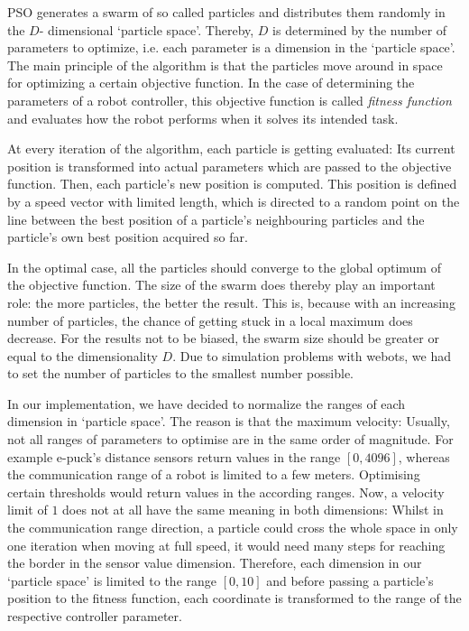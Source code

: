 \documentclass[journal]{IEEEtran}
\begin{document}
PSO generates a swarm of so called particles and distributes them randomly in the $D$-
dimensional  `particle space'. Thereby, $D$ is determined by the number of parameters to 
optimize, i.e. each parameter is a dimension in the `particle space'. The main principle of 
the algorithm is that the particles move around in space for optimizing a certain objective 
function. In the case of determining the parameters of a robot controller, this objective 
function is called \textit{fitness function} and evaluates how the robot performs when it 
solves its intended task. 

At every iteration of the algorithm, each particle is getting evaluated: Its current position 
is transformed into actual parameters which are passed to the objective function. Then, each 
particle's new position is computed. This position is defined by a speed vector with limited 
length, which is directed to a random point on the line between the best position of a 
particle's neighbouring particles and the particle's own best position acquired so far. 

In the optimal case, all the particles should converge to the global optimum of the objective function. The size of the swarm does thereby play an important role: the more particles, the better the result. This is, because with an increasing number of particles, the chance of getting stuck in a local maximum does decrease. For the results not to be biased, the swarm size should be greater or equal to the dimensionality $D$. Due to simulation problems with webots, we had to set the number of particles to the smallest number possible. 

In our implementation, we have decided to normalize the ranges of each dimension in `particle space'. The reason is that the maximum velocity: Usually, not all ranges of parameters to optimise are in the same order of magnitude. For example e-puck's distance sensors return values in the range $[0,4096]$, whereas the communication range of a robot is limited to a few meters. Optimising certain thresholds would return values in the according ranges. Now, a velocity limit of $1$ does not at all have the same meaning in both dimensions: Whilst in the communication range direction, a particle could cross the whole space in only one iteration when moving at full speed, it would need many steps for reaching the border in the sensor value dimension. Therefore, each dimension in our `particle space' is limited to the range $[0, 10]$ and before passing a particle's position to the fitness function, each coordinate is transformed to the range of the respective controller parameter.
\end{document}
